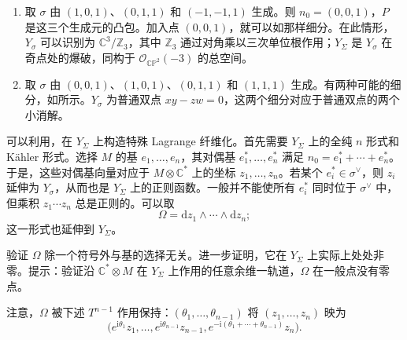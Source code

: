 \begin{example}\label{ex:7.8}
\begin{enumerate}
\item 取 $\sigma$ 由 $(1,0,1)$、$(0,1,1)$ 和 $(-1,-1,1)$ 生成。则 $n_0=(0,0,1)$，$P$ 是这三个生成元的凸包。加入点 $(0,0,1)$，就可以如那样细分。在此情形，$Y_\sigma$ 可以识别为 $\mathbb C^3/\mathbb Z_3$，其中 $\mathbb Z_3$ 通过对角乘以三次单位根作用；$Y_\Sigma$ 是 $Y_\sigma$ 在奇点处的爆破，同构于 $\mathcal O_{\mathbb{CP}^2}(-3)$ 的总空间。
\item 取 $\sigma$ 由 $(0,0,1)$、$(1,0,1)$、$(0,1,1)$ 和 $(1,1,1)$ 生成。有两种可能的细分，如所示。$Y_\sigma$ 为普通双点 $xy-zw=0$，这两个细分对应于普通双点的两个小消解。
\end{enumerate}
\end{example}
\begin{figure}[H]
\centering
{}
\BookNumberOnlyCaption\label{fig:7.2}
\end{figure}
\begin{figure}[H]
\centering
{}
\BookNumberOnlyCaption\label{fig:7.3}
\end{figure}

可以利用，在 $Y_\Sigma$ 上构造特殊 Lagrange 纤维化。首先需要 $Y_\Sigma$ 上的全纯 $n$ 形式和 Kähler 形式。选择 $M$ 的基 $e_1,\ldots,e_n$，其对偶基 $e_1^*,\ldots,e_n^*$ 满足 $n_0=e_1^*+\cdots+e_n^*$。于是，这些对偶基向量对应于 $M\otimes\mathbb C^*$ 上的坐标 $z_1,\ldots,z_n$。若某个 $e_i^*\in\sigma^\vee$，则 $z_i$ 延伸为 $Y_\sigma$，从而也是 $Y_\Sigma$ 上的正则函数。一般并不能使所有 $e_i^*$ 同时位于 $\sigma^\vee$ 中，但乘积 $z_1\cdots z_n$ 总是正则的。可以取
\[
\Omega=\mathrm dz_1\wedge\cdots\wedge\mathrm dz_n;
\]
这一形式也延伸到 $Y_\Sigma$。

\begin{exercise}\label{exer:7.9}
验证 $\Omega$ 除一个符号外与基的选择无关。进一步证明，它在 $Y_\Sigma$ 上实际上处处非零。提示：验证沿 $\mathbb C^*\otimes M$ 在 $Y_\Sigma$ 上作用的任意余维一轨道，$\Omega$ 在一般点没有零点。
\end{exercise}

注意，$\Omega$ 被下述 $T^{n-1}$ 作用保持：$(\theta_1,\ldots,\theta_{n-1})$ 将 $(z_1,\ldots,z_n)$ 映为
\[
\bigl(e^{\mathrm i\theta_1}z_1,\ldots,
e^{\mathrm i\theta_{n-1}}z_{n-1},
e^{-\mathrm i(\theta_1+\cdots+\theta_{n-1})}z_n\bigr).
\]

